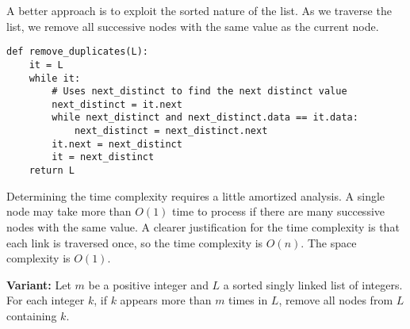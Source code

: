 \documentclass[11pt,a4paper]{article}
\begin{document}
A better approach is to exploit the sorted nature of the list. As we traverse
the list, we remove all successive nodes with the same value as the current
node.

\begin{verbatim}
def remove_duplicates(L):
    it = L
    while it:
        # Uses next_distinct to find the next distinct value 
        next_distinct = it.next
        while next_distinct and next_distinct.data == it.data:
            next_distinct = next_distinct.next 
        it.next = next_distinct
        it = next_distinct
    return L  
\end{verbatim}

Determining the time complexity requires a little amortized analysis. A single
node may take more than $O(1)$ time to process if there are many successive
nodes with the same value. A clearer justification for the time complexity is
that each link is traversed once, so the time complexity is $O(n)$. The space
complexity is $O(1)$.

\textbf{Variant:} Let $m$ be a positive integer and $L$ a sorted singly linked
list of integers. For each integer $k$, if $k$ appears more than $m$ times in
$L$, remove all nodes from $L$ containing $k$.
\end{document}

